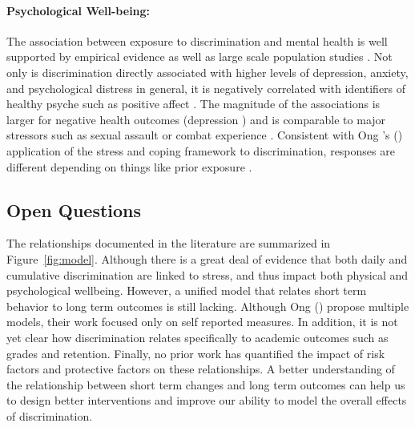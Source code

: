 \paragraph{Psychological Well-being:}
\label{sec:back-discrimination-mental}
The association between exposure to discrimination and mental health is well supported by empirical evidence \citep{Pascoe:2009} as well as large scale population studies \citep{Kessler:1999}. Not only is discrimination directly associated with higher levels of depression, anxiety, and psychological distress in general, it is negatively correlated with identifiers of healthy psyche such as positive affect \citep{Schmitt:2014}. The magnitude of the associations is larger for negative health outcomes (\eg depression \citep{Schmitt:2014}) and is comparable to major stressors such as sexual assault or combat experience \citep{Kessler:1999}. 
Consistent with Ong \etal's (\citeyear{Ong:2009}) application of the stress and coping framework to discrimination, responses are different depending on things like prior exposure  \citep{Kessler:1999}. 

\subsection{Open Questions}
\noindent The relationships documented in the literature are summarized in Figure~\ref{fig:model}. Although there is a great deal of evidence that both daily and cumulative discrimination are linked to stress, and thus impact both physical and psychological wellbeing.  However, a unified model that relates short term behavior to long term outcomes is still lacking. Although Ong \etal (\citeyear{Ong:2009}) propose multiple models, their work focused only on self reported measures. In addition, it is not yet clear how discrimination relates specifically to academic outcomes such as grades and retention. Finally, no prior work has quantified the impact of risk factors and protective factors on these relationships. 
A better understanding of the relationship between short term changes and long term outcomes can help us to design better interventions and improve our ability to model the overall effects of discrimination.